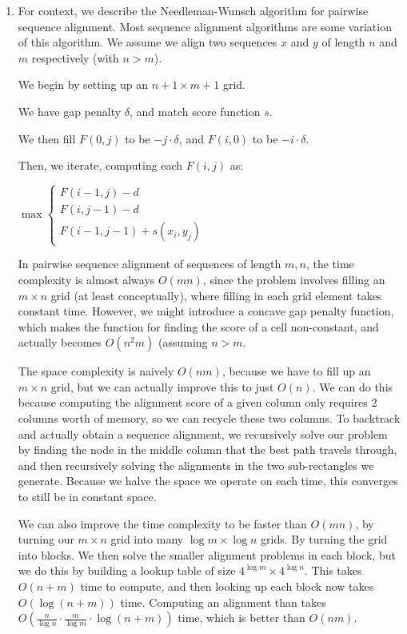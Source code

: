 


\begin{enumerate}[label=(\alph*)]
  \item
    For context, we describe the Needleman-Wunsch algorithm for pairwise sequence alignment. Most sequence alignment algorithms are some variation of this algorithm. We assume we align two sequences $x$ and $y$ of length $n$ and $m$ respectively (with $n > m$).

    We begin by setting up an $n+1 \times m+1$ grid.

    We have gap penalty $\delta$, and match score function $s$.

    We then fill $F(0,j)$ to be $-j \cdot \delta$, and $F(i,0)$ to be $-i \cdot \delta$.

    Then, we iterate, computing each $F(i,j)$ as:

    $\max \begin{cases}F(i-1,j) - d \\F(i, j-1) - d\\F(i-1, j-1) + s(x_i, y_j)\end{cases}$

    In pairwise sequence alignment of sequences of length $m,n$, the time complexity is almost always $O(mn)$, since the problem involves filling an $m\times n$ grid (at least conceptually), where filling in each grid element takes constant time. However, we might introduce a concave gap penalty function, which makes the function for finding the score of a cell non-constant, and actually becomes $O(n^2 m)$ (assuming $n>m$.

    The space complexity is naively $O(nm)$, because we have to fill up an $m\times n$ grid, but we can actually improve this to just $O(n)$. We can do this because computing the alignment score of a given column only requires 2 columns worth of memory, so we can recycle these two columns. To backtrack and actually obtain a sequence alignment, we recursively solve our problem by finding the node in the middle column that the best path travels through, and then recursively solving the alignments in the two sub-rectangles we generate. Because we halve the space we operate on each time, this converges to still be in constant space.

    We can also improve the time complexity to be faster than $O(mn)$, by turning our $m \times n$ grid into many $\log m \times \log n$ grids. By turning the grid into blocks. We then solve the smaller alignment problems in each block, but we do this by building a lookup table of size $4^{\log m} \times 4^{\log n}$. This takes $O(n+m)$ time to compute, and then looking up each block now takes $O(\log (n+m))$ time. Computing an alignment than takes $O(\frac{n}{\log n} \cdot \frac{m}{\log m} \cdot \log (n+m))$ time, which is better than $O(nm)$.


\end{enumerate}
